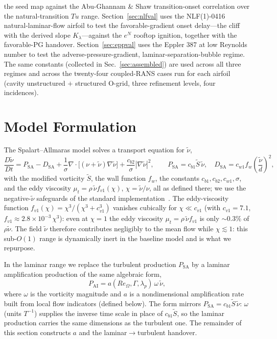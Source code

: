 \documentclass[journal]{new-aiaa}
\begin{document}
the seed map against the Abu-Ghannam \& Shaw transition-onset correlation over
the natural-transition $Tu$ range.
Section~\ref{sec:nlfval} uses the NLF(1)-0416 natural-laminar-flow airfoil to
test the favorable-gradient onset delay---the cliff with the derived slope
$K_\lambda$---against the $e^N$ rooftop ignition, together with the
favorable-PG handover.
Section~\ref{sec:eppval} uses the Eppler 387 at low Reynolds number to test the
adverse-pressure-gradient, laminar-separation-bubble regime. The same
constants (collected in Sec.~\ref{sec:assembled}) are used across all three
regimes and across the twenty-four coupled-RANS cases run for each airfoil
(cavity unstructured $+$ structured O-grid, three refinement levels, four
incidences).

\section{Model Formulation}\label{sec:model}

The Spalart--Allmaras model \cite{spalart_allmaras_1992} solves a transport equation
for $\tilde\nu$,
\begin{equation}
  \frac{D\tilde\nu}{Dt} = P_\mathrm{SA} - D_\mathrm{SA}
  + \frac{1}{\sigma}\nabla\!\cdot\!\big[(\nu+\tilde\nu)\nabla\tilde\nu\big]
  + \frac{c_{b2}}{\sigma}|\nabla\tilde\nu|^2,
  \qquad
  P_\mathrm{SA} = c_{b1}\tilde S\,\tilde\nu,
  \quad
  D_\mathrm{SA} = c_{w1}f_w\!\left(\frac{\tilde\nu}{d}\right)^{\!2},
  \label{eq:sa}
\end{equation}
with the modified
vorticity $\tilde S$, the wall function $f_w$, the constants $c_{b1},c_{b2},c_{w1},
\sigma$, and the eddy viscosity $\mu_t=\rho\,\tilde\nu f_{v1}(\chi)$,
$\chi=\tilde\nu/\nu$, all as defined there; we use the negative-$\tilde\nu$
safeguards of the standard implementation~\cite{allmaras_2012}. The eddy-viscosity function
$f_{v1}(\chi)\!=\!\chi^3/(\chi^3+c_{v1}^3)$ vanishes cubically for
$\chi\!\ll\!c_{v1}$ (with $c_{v1}\!=\!7.1$,
$f_{v1}\!\approx\!2.8\!\times\!10^{-3}\,\chi^3$): even at $\chi\!=\!1$ the
eddy viscosity $\mu_t\!=\!\rho\,\tilde\nu f_{v1}$ is only $\sim\!0.3\%$ of
$\rho\tilde\nu$. The field $\tilde\nu$
therefore contributes negligibly to the mean flow while $\chi\lesssim1$: this
sub-$O(1)$ range is dynamically inert in the baseline model and is what we
repurpose.

In the laminar range we replace the turbulent production $P_\mathrm{SA}$ by a
laminar amplification production of the same algebraic form,
\begin{equation}
  P_\mathrm{AI} = a(Re_\Omega,\Gamma,\lambda_p)\,\omega\,\tilde\nu ,
  \label{eq:pai}
\end{equation}
where $\omega$ is the vorticity magnitude and $a$ is a nondimensional
amplification rate built from local flow indicators (defined below). The form
mirrors $P_\mathrm{SA}=c_{b1}\tilde S\,\tilde\nu$: $\omega$ (units $T^{-1}$)
supplies the inverse time scale in place of $c_{b1}\tilde S$, so the laminar
production carries the same dimensions as the turbulent one. The remainder
of this section constructs $a$ and the laminar$\to$turbulent handover.
\end{document}
